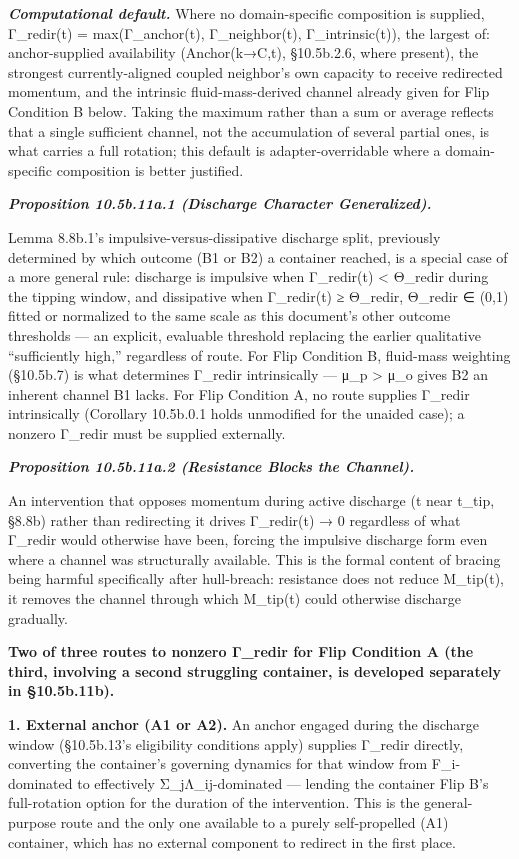 \documentclass[
]{article}
\begin{document}
\emph{\textbf{Computational default.}} Where no domain-specific
composition is supplied, Γ\_redir(t) = max(Γ\_anchor(t), Γ\_neighbor(t),
Γ\_intrinsic(t)), the largest of: anchor-supplied availability
(Anchor(k→C,t), §10.5b.2.6, where present), the strongest
currently-aligned coupled neighbor's own capacity to receive redirected
momentum, and the intrinsic fluid-mass-derived channel already given for
Flip Condition B below. Taking the maximum rather than a sum or average
reflects that a single sufficient channel, not the accumulation of
several partial ones, is what carries a full rotation; this default is
adapter-overridable where a domain-specific composition is better
justified.

\emph{\textbf{Proposition 10.5b.11a.1 (Discharge Character
Generalized).}}

Lemma 8.8b.1's impulsive-versus-dissipative discharge split, previously
determined by which outcome (B1 or B2) a container reached, is a special
case of a more general rule: discharge is impulsive when Γ\_redir(t)
\textless{} Θ\_redir during the tipping window, and dissipative when
Γ\_redir(t) ≥ Θ\_redir, Θ\_redir ∈ (0,1) fitted or normalized to the
same scale as this document's other outcome thresholds --- an explicit,
evaluable threshold replacing the earlier qualitative ``sufficiently
high,'' regardless of route. For Flip Condition B, fluid-mass weighting
(§10.5b.7) is what determines Γ\_redir intrinsically --- μ\_p
\textgreater{} μ\_o gives B2 an inherent channel B1 lacks. For Flip
Condition A, no route supplies Γ\_redir intrinsically (Corollary
10.5b.0.1 holds unmodified for the unaided case); a nonzero Γ\_redir
must be supplied externally.

\emph{\textbf{Proposition 10.5b.11a.2 (Resistance Blocks the Channel).}}

An intervention that opposes momentum during active discharge (t near
t\_tip, §8.8b) rather than redirecting it drives Γ\_redir(t) → 0
regardless of what Γ\_redir would otherwise have been, forcing the
impulsive discharge form even where a channel was structurally
available. This is the formal content of bracing being harmful
specifically after hull-breach: resistance does not reduce M\_tip(t), it
removes the channel through which M\_tip(t) could otherwise discharge
gradually.

\textbf{Two of three routes to nonzero Γ\_redir for Flip Condition A
(the third, involving a second struggling container, is developed
separately in §10.5b.11b).}

\textbf{1. External anchor (A1 or A2).} An anchor engaged during the
discharge window (§10.5b.13's eligibility conditions apply) supplies
Γ\_redir directly, converting the container's governing dynamics for
that window from F\_i-dominated to effectively Σ\_jΛ\_ij-dominated ---
lending the container Flip B's full-rotation option for the duration of
the intervention. This is the general-purpose route and the only one
available to a purely self-propelled (A1) container, which has no
external component to redirect in the first place.
\end{document}
